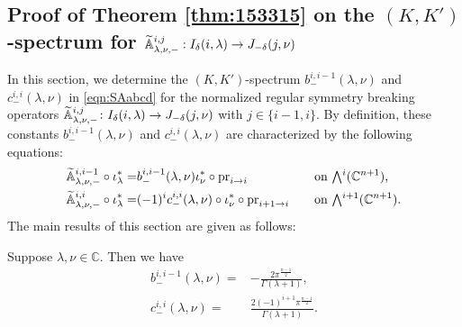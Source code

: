 \subsection{Proof of Theorem \ref{thm:153315}
 on the $(K,K')$-spectrum for ${\widetilde{\mathbb{A}}}_{{\lambda},{\nu},{-}}^{{i,j}}:
I_{\delta}(i,\lambda) \to J_{-\delta}(j,\nu)$}
\label{subsec:Apm1}



In this section,
 we determine the $(K,K')$-spectrum
 $b_-^{i,i-1}(\lambda,\nu)$ and  $c_-^{i,i}(\lambda,\nu)$
 in \eqref{eqn:SAabcd}
 for the normalized regular symmetry breaking operators
$
{\widetilde{\mathbb{A}}}_{{\lambda},{\nu},{-}}^{{i,j}}
\colon
I_{\delta}(i,\lambda) \to J_{-\delta}(j,\nu)
$
 with $j \in \{i-1, i\}$.  
By definition,
 these constants 
$
   b_-^{i,i-1}(\lambda,\nu)
$
 and $c_-^{i,i}(\lambda,\nu)$
 are characterized by the following equations:
\begin{alignat}{2}
\label{eqn:Abij}
\Atbb \lambda \nu - {i,i-1}
\circ
\iota_{\lambda}^{\ast}
=&
b_-^{i,i-1}(\lambda,\nu)
\iota_{\nu}^{\ast}
\circ
\pr ii
\quad
&&\text{on $\Exterior^{i}({\mathbb{C}}^{n+1})$, }
\\
\label{eqn:Acij}
\Atbb \lambda \nu - {i,i}
\circ
\iota_{\lambda}^{\ast}
=&
(-1)^{i}
c_-^{i,i}(\lambda,\nu)
\circ
\iota_{\nu}^{\ast}
\circ
\pr {i+1}i
\quad
&&\text{on $\Exterior^{i+1}({\mathbb{C}}^{n+1})$}.  
\end{alignat}
The main results of this section are given as follows:
\begin{theorem}
\label{thm:CApm1}
Suppose $\lambda, \nu \in {\mathbb{C}}$.  
Then we have
\begin{align}
\label{eqn:Cpmii1}
   b_-^{i,i-1}(\lambda,\nu)
   =&
   -
   \frac
   {2\pi^{\frac {n-1}{2}}}
   {\Gamma(\lambda+1)}, 
\\
\label{eqn:pmIi}
   c_-^{i,i}(\lambda,\nu)
   =&
   \frac
   {2 (-1)^{i+1} \pi^{\frac {n-1}{2}}}
   {\Gamma(\lambda+1)}.  
\end{align}
\end{theorem}

